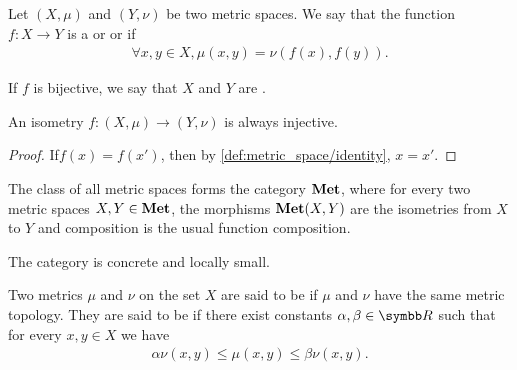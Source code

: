 \begin{definition}\label{def:isometry}\cite[253]{Engelking1989}
  Let \( (X, \mu) \) and \( (Y, \nu) \) be two metric spaces. We say that the function \( f: X \to Y \) is a  or  or  if
  \begin{align*}
    \forall x, y \in X, \mu(x, y) = \nu(f(x), f(y)).
  \end{align*}

  If \( f \) is bijective, we say that \( X \) and \( Y \) are .
\end{definition}

\begin{proposition}\label{def:isometry_is_injective}
  An isometry \( f: (X, \mu) \to (Y, \nu) \) is always injective.
\end{proposition}
\begin{proof}
  If\LEM \( f(x) = f(x') \), then by \ref{def:metric_space/identity}, \( x = x' \).
\end{proof}

\begin{definition}\label{def:category_of_metric_spaces}
  The class of all metric spaces forms the category \( \operatorname{\mathbf{Met}} \), where for every two metric spaces \( X, Y \in \operatorname{\mathbf{Met}} \), the morphisms \( \operatorname{\mathbf{Met}}(X, Y) \) are the isometries from \( X \) to \( Y \) and composition is the usual function composition.

  The category is concrete and locally small.
\end{definition}

\begin{definition}\label{def:equivalent_metrics}
  Two metrics \( \mu \) and \( \nu \) on the set \( X \) are said to be  if \( \mu \) and \( \nu \) have the same metric topology. They are said to be  if there exist constants \( \alpha, \beta \in \BB{R} \) such that for every \( x, y \in X \) we have
  \begin{align*}
    \alpha \nu(x, y) \leq \mu(x, y) \leq \beta \nu(x, y).
  \end{align*}
\end{definition}

